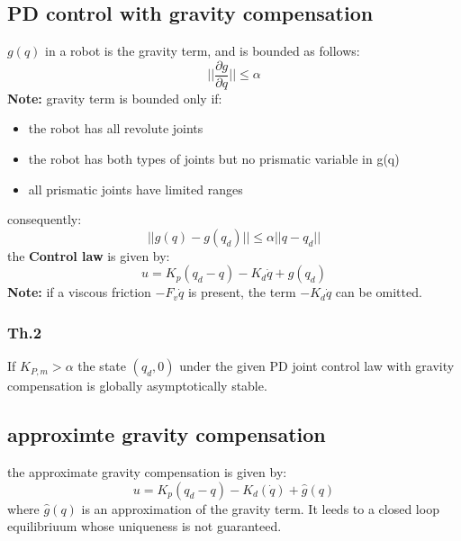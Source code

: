 \documentclass[a4paper,12pt]{article}
\begin{document}
\subsection{PD control with gravity compensation}
$g(q)$ in a robot is the gravity term, and is bounded as follows:
\begin{equation}
    ||\frac{\partial g}{\partial q}|| \leq \alpha
\end{equation}
\textbf{Note:} gravity term is bounded only if:
\begin{itemize}
    \item the robot has all revolute joints
    \item the robot has both types of joints but no prismatic variable in g(q)
    \item all prismatic joints have limited ranges
\end{itemize}
consequently:
\begin{equation}
    ||g(q)-g(q_d)|| \leq \alpha ||q-q_d||
\end{equation}
the \textbf{Control law} is given by:
\begin{equation}
    u = K_p(q_d-q) - K_d\dot{q} + g(q_d)
\end{equation}
\textbf{Note:} if a viscous friction $-F_v\dot{q}$ is present,
 the term $-K_d\dot{q}$ can be omitted.\\
\subsubsection{Th.2}
If $K_{P,m} > \alpha$ the state $(q_d,0)$ under the given
 PD joint control law with gravity compensation is
  globally asymptotically stable.
\subsection{approximte gravity compensation}
the approximate gravity compensation is given by:
\begin{equation}
    u = K_p(q_d-q) - K_d(\dot{q}) + \hat{g}(q)
\end{equation}
where $\hat{g}(q)$ is an approximation of the gravity term.
It leeds to a closed loop equilibriuum whose uniqueness 
is not guaranteed.
\end{document}
